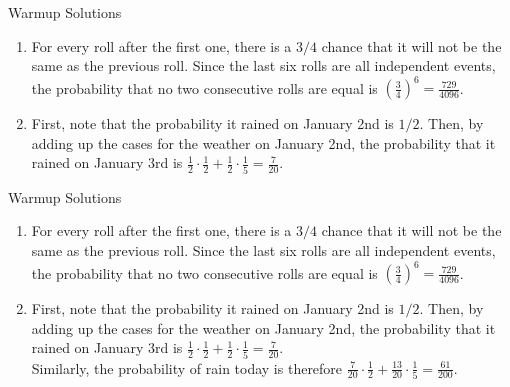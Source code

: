 \documentclass[9pt]{beamer}
\begin{document}
\begin{frame}[t]{Warmup Solutions}
    \begin{enumerate}
        \item For every roll after the first one, there is a $3/4$ chance that it will not be the same as the previous roll. Since the last six rolls are all independent events, the probability that no two consecutive rolls are equal is $\left(\frac{3}{4}\right)^6=\frac{729}{4096}$.
        \item First, note that the probability it rained on January 2nd is $1/2$. Then, by adding up the cases for the weather on January 2nd, the probability that it rained on January 3rd is $\frac{1}{2}\cdot\frac{1}{2}+\frac{1}{2}\cdot\frac{1}{5}=\frac{7}{20}$.\\
        
        
    \end{enumerate}
    
\end{frame}
 
\begin{frame}[t]{Warmup Solutions}
    \begin{enumerate}
        \item For every roll after the first one, there is a $3/4$ chance that it will not be the same as the previous roll. Since the last six rolls are all independent events, the probability that no two consecutive rolls are equal is $\left(\frac{3}{4}\right)^6=\frac{729}{4096}$.
        \item First, note that the probability it rained on January 2nd is $1/2$. Then, by adding up the cases for the weather on January 2nd, the probability that it rained on January 3rd is $\frac{1}{2}\cdot\frac{1}{2}+\frac{1}{2}\cdot\frac{1}{5}=\frac{7}{20}$.\\
        Similarly, the probability of rain today is therefore $\frac{7}{20}\cdot \frac{1}{2}+\frac{13}{20}\cdot\frac{1}{5}=\frac{61}{200}$.
        
    \end{enumerate}
    
\end{frame}
 
\end{document}
